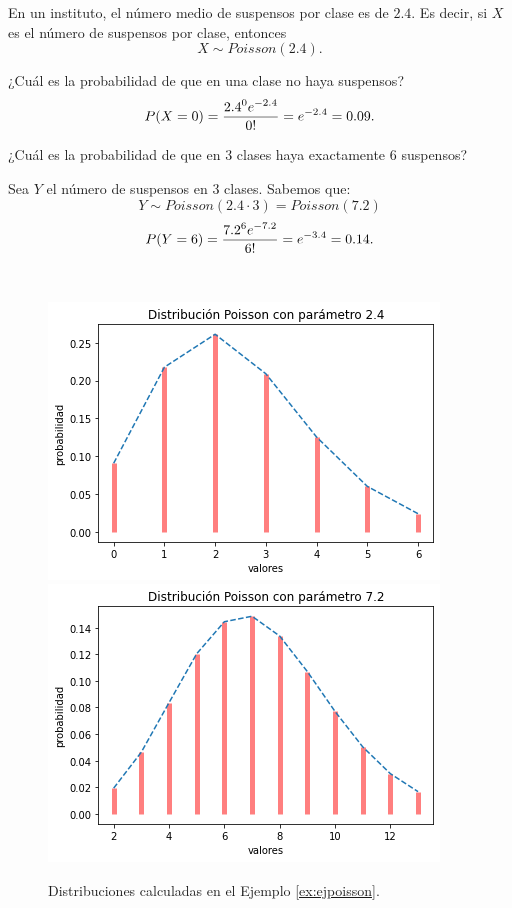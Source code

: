 \documentclass[oneside,openright,titlepage,numbers=noenddot,openany,headinclude,footinclude=true,
cleardoublepage=empty,abstractoff,BCOR=5mm,paper=a4,fontsize=12pt,main=spanish]{scrreprt}
\begin{document}
\begin{example} \label{ex:ejpoisson}
En un instituto, el número medio de suspensos por clase es de $2.4$. Es decir, si $X$ es el número de suspensos por clase, entonces $$X \sim Poisson(2.4).$$ 

¿Cuál es la probabilidad de que en una clase no haya suspensos? $$P(X=0)=\frac{\displaystyle 2.4^0 e^{-2.4}}{\displaystyle 0!}=e^{-2.4}=0.09.$$

¿Cuál es la probabilidad de que en 3 clases haya exactamente 6 suspensos?

Sea $Y$ el número de suspensos en 3 clases. Sabemos que: $$Y \sim Poisson(2.4\cdot 3)=Poisson(7.2)$$ $$P(Y=6)=\frac{\displaystyle 7.2^6 e^{-7.2}}{\displaystyle 6!}=e^{-3.4}=0.14.$$
\end{example}\

\begin{figure}[h]
      \includegraphics[width=\linewidth]{images/poisson1.png}
    \endminipage\hfill
      \includegraphics[width=\linewidth]{images/poisson2.png}
    \endminipage
     \caption{Distribuciones calculadas en el Ejemplo \ref{ex:ejpoisson}.}
\end{figure}
\end{document}
